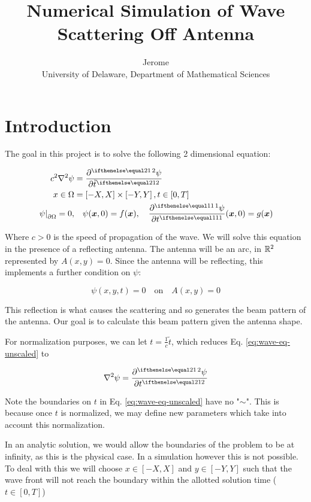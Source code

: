 \documentclass{article}
\title{Numerical Simulation of Wave Scattering Off Antenna}
\author{Jerome \\
University of Delaware, Department of Mathematical Sciences}
\date{}
\begin{document}
\maketitle

\tableofcontents

\newpage

\section{Introduction}

The goal in this project is to solve the following 2 dimensional equation:

\begin{equation}
  \label{eq:wave-eq-unscaled}
  \begin{split}
  c^2 \nabla^2 \psi & = \pder[2]{\psi}{\tilde{t}} \\
  x \in \Omega & = \left[-X,X\right] \times \left[-Y,Y\right],
  t \in \left[0,T\right] \\
  \left.\psi\right|_{\partial \Omega} = 0, & \quad
  \psi(\vec{x},0) = f(\vec{x}), \quad \pder{\psi}{t}(\vec{x},0) = g(\vec{x})
  \end{split}
\end{equation}

Where $c > 0$ is the speed of propagation of the wave.
We will solve this equation in the presence of a reflecting antenna.
The antenna will be an arc, in $\mathbb{R}^2$ represented by $A(x,y) = 0$.
Since the antenna will be reflecting, this implements a further condition on
$\psi$:

$$\psi(x,y,t) = 0 \quad \text{on} \quad A(x,y) = 0$$

This reflection is what causes the scattering and so generates the
beam pattern of the antenna.
Our goal is to calculate this beam pattern given the antenna shape.

For normalization purposes, we can let $t = \frac{1}{c}\tilde{t}$, which
reduces Eq. \ref{eq:wave-eq-unscaled} to

\begin{equation}
  \label{eq:wave-eq}
  \nabla^2 \psi = \pder[2]{\psi}{t}
\end{equation}

Note the boundaries on $t$ in Eq. \ref{eq:wave-eq-unscaled} have no "$\sim$".
This is because once $t$ is normalized, we may define new parameters which
take into account this normalization.

In an analytic solution, we would allow the boundaries of the problem to be
at infinity, as this is the physical case.  In a simulation however this is
not possible.  To deal with this we will choose $x \in \left[-X,X\right]$ and
$y \in \left[-Y,Y\right]$ such that the wave front will not reach the
boundary within the allotted solution time ($t \in \left[0,T\right]$)
\end{document}
